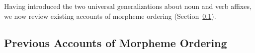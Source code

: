 \documentclass[11pt,letterpaper]{article}
\newcommand\mhahn[1]{{\color{red}(#1)}}
\newcommand{\jd}[1]{\textcolor{Pink}{[jd: #1]}}
\begin{document}

Having introduced the two universal generalizations about noun and verb affixes, we now review existing accounts of morpheme ordering (Section~\ref{sec:previous}). 







\subsection{Previous Accounts of Morpheme Ordering}\label{sec:previous}
\end{document}

